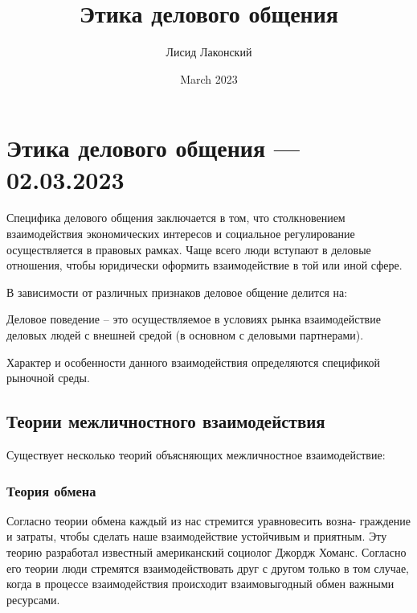 \documentclass{article}
\title{Этика делового общения}
\author{Лисид Лаконский}
\date{March 2023}
\begin{document}
\raggedright

\maketitle
\tableofcontents
\pagebreak

\section{Этика делового общения — 02.03.2023}

Специфика делового общения заключается в том, что столкновением
взаимодействия экономических интересов и социальное регулирование осуществляется в правовых рамках. Чаще всего люди вступают в деловые отношения, чтобы юридически оформить взаимодействие в той или иной сфере.

В зависимости от различных признаков деловое общение делится на:

\begin{multienumerate}
\end{multienumerate}

Деловое поведение – это осуществляемое в условиях рынка взаимодействие деловых людей с внешней средой (в основном с деловыми партнерами).

Характер и особенности данного взаимодействия определяются спецификой рыночной среды.

\subsection{Теории межличностного взаимодействия}

Существует несколько теорий объясняющих межличностное взаимодействие:

\begin{multienumerate}
\end{multienumerate}

\subsubsection{Теория обмена}

Согласно теории обмена каждый из нас стремится уравновесить возна-
граждение и затраты, чтобы сделать наше взаимодействие устойчивым и приятным. Эту теорию разработал известный американский социолог Джордж Хоманс. Согласно его теории люди стремятся взаимодействовать друг с другом только в том случае, когда в процессе взаимодействия происходит взаимовыгодный обмен важными ресурсами.
\end{document}

